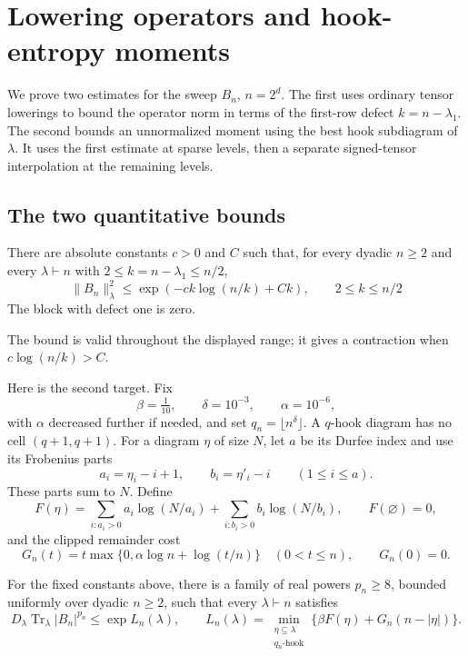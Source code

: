 \section{Lowering operators and hook-entropy moments}
\label{ten:lowering}
We prove two estimates for the sweep $B_n$, $n=2^d$. The first uses
ordinary tensor lowerings to bound the operator norm in terms of the
first-row defect $k=n-\lambda_1$. The second bounds an unnormalized
moment using the best hook subdiagram of $\lambda$. It uses the first
estimate at sparse levels, then a separate signed-tensor interpolation
at the remaining levels.

\subsection{The two quantitative bounds}

\begin{proposition}\label{s:lowering-norm}
There are absolute constants $c>0$ and $C$ such that, for every
dyadic $n\ge2$ and every $\lambda\vdash n$ with
$2\le k=n-\lambda_1\le n/2$,
\begin{equation}
 \|B_n\|_\lambda^2 \le \exp(-c k\log(n/k)+C k),\qquad
                         2\le k\le n/2                     \label{ten:lowering:eq:1}
\end{equation}
The block with defect one is zero.
\end{proposition}

The bound is valid throughout the displayed range; it gives a
contraction when $c\log(n/k)>C$.

Here is the second target. Fix
\[
 \beta=\tfrac1{10},\qquad \delta=10^{-3},\qquad \alpha=10^{-6},
\]
with $\alpha$ decreased further if needed, and set
$q_n=\lfloor n^\delta\rfloor$. A $q$-hook diagram has no cell
$(q+1,q+1)$. For a diagram $\eta$ of size $N$, let $a$ be its
Durfee index and use its Frobenius parts
\[
 a_i=\eta_i-i+1,\qquad b_i=\eta'_i-i\qquad(1\le i\le a).
\]
These parts sum to $N$. Define
\[
 F(\eta)=\sum_{i:a_i>0}a_i\log(N/a_i)
          +\sum_{i:b_i>0}b_i\log(N/b_i),
 \qquad F(\varnothing)=0,
\]
and the clipped remainder cost
\begin{equation}\label{ten:lowering:eq:3}
 G_n(t)=t\max\{0,\alpha\log n+\log(t/n)\}\quad(0<t\le n),
 \qquad G_n(0)=0.
\end{equation}

\begin{proposition}
\label{ten:lowering:main}
For the fixed constants above, there is a family of real powers
$p_n\ge8$, bounded uniformly over dyadic $n\ge2$, such that every
$\lambda\vdash n$ satisfies
\begin{equation}\label{ten:lowering:eq:6}
 D_\lambda\operatorname{Tr}_\lambda |B_n|^{p_n}
 \le \exp L_n(\lambda),\qquad
 L_n(\lambda)=\min_{\substack{\eta\subseteq\lambda\\q_n\text{-hook}}}
             \{\beta F(\eta)+G_n(n-|\eta|)\}.
\end{equation}
\end{proposition}

